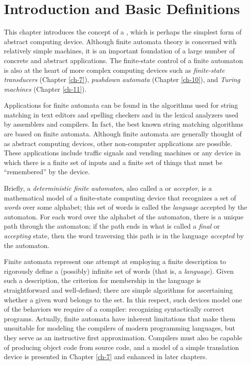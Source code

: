 \chapter{Introduction and Basic Definitions}\label{ch-1}

This chapter introduces the concept of a \emph{}, which
is perhaps the simplest form of abstract computing device. Although finite
automata theory is concerned with relatively simple machines, it is an important
foundation of a large number of concrete and abstract applications. The
finite-state control of a finite automaton is also at the heart of more complex
computing devices such as \emph{finite-state transducers} (Chapter \ref{ch-7}),
\emph{pushdown automata} (Chapter \ref{ch-10}), and \emph{Turing machines}
(Chapter \ref{ch-11}).

Applications for finite automata can be found in the algorithms used for string
matching in text editors and spelling checkers and in the lexical analyzers used
by assemblers and compilers. In fact, the best known string matching algorithms
are based on finite automata. Although finite automata are generally thought of
as abstract computing devices, other non-computer applications are possible.
These applications include traffic signals and vending machines or any device in
which there is a finite set of inputs and a finite set of things that must be
``remembered'' by the device.

Briefly, a \emph{deterministic finite automaton}, also called a
\emph{} or \emph{acceptor}, is a mathematical model of
a finite-state computing device that recognizes a set of \emph{words} over some
alphabet; this set of words is called the \emph{language} accepted by the
automaton. For each word over the alphabet of the automaton, there is a unique
path through the automaton; if the path ends in what is called a \emph{final} or
\emph{accepting} state, then the word traversing this path is in the language
\emph{accepted} by the automaton.

Finite automata represent one attempt at employing a finite description to
rigorously define a (possibly) infinite set of words (that is, a 
\emph{language}). Given such a description, the criterion for membership in the
language is straightforward and well-defined; there are simple algorithms for
ascertaining whether a given word belongs to the set. In this respect, such
devices model one of the behaviors we require of a compiler: recognizing
syntactically correct programs. Actually, finite automata have inherent
limitations that make them unsuitable for modeling the compilers of modern
programming languages, but they serve as an instructive first approximation.
Compilers must also be capable of producing object code from source code, and a
model of a simple translation device is presented in Chapter \ref{ch-7} and
enhanced in later chapters.


